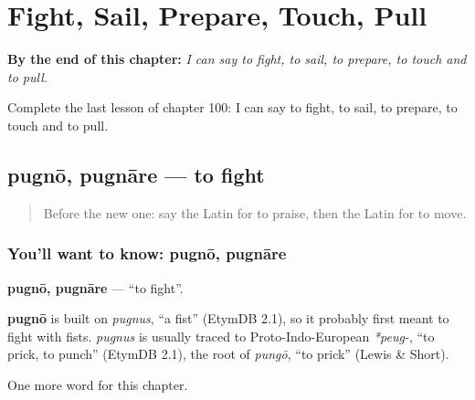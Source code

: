 
\chapter{Fight, Sail, Prepare, Touch, Pull}
\label{ch:la-fight-sail-prepare-touch-pull}

\begin{chapteropening}
\textbf{By the end of this chapter:} \emph{I can say to fight, to sail, to prepare, to touch and to pull.}

Complete the last lesson of chapter 100: I can say to fight, to sail, to prepare, to touch and to pull.
\end{chapteropening}

\section[pugnō, pugnāre]{pugnō, pugnāre — to fight}

\label{lesson:LA-C100-pugno}



\begin{quote}
Before the new one: say the Latin for to praise, then the Latin for to move.
\end{quote}

\subsection*{You'll want to know: pugnō, pugnāre}
\textbf{pugnō, pugnāre} — \textquotedblleft{}to fight\textquotedblright{}.

\begin{cousinweb}
\textbf{pugnō} is built on \emph{pugnus}, \textquotedblleft{}a fist\textquotedblright{} (EtymDB 2.1), so it probably first meant to fight with fists. \emph{pugnus} is usually traced to Proto-Indo-European \emph{*peug-}, \textquotedblleft{}to prick, to punch\textquotedblright{} (EtymDB 2.1), the root of \emph{pungō}, \textquotedblleft{}to prick\textquotedblright{} (Lewis \& Short).
\end{cousinweb}

\begin{grammarlens}[title={What you've built}]
One more word for this chapter.
\end{grammarlens}


